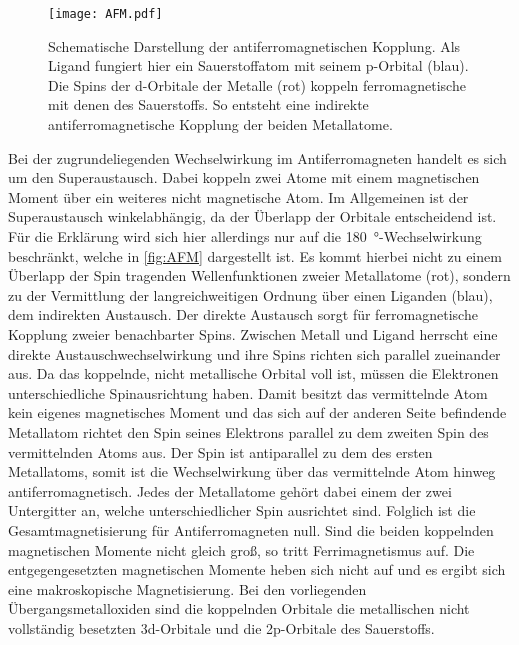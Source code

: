         \begin{figure}
            \centering
            \texttt{[image: AFM.pdf]}
            \caption{Schematische Darstellung der antiferromagnetischen Kopplung.
            Als Ligand fungiert hier ein Sauerstoffatom mit seinem p-Orbital (blau).
            Die Spins der d-Orbitale der Metalle (rot) koppeln ferromagnetische mit denen des Sauerstoffs.
            So entsteht eine indirekte antiferromagnetische Kopplung der beiden Metallatome.}
            \label{fig:AFM}
        \end{figure}
        Bei der zugrundeliegenden Wechselwirkung im Antiferromagneten handelt es sich um den Superaustausch.
        Dabei koppeln zwei Atome mit einem magnetischen Moment über ein weiteres nicht magnetische Atom. 
        Im Allgemeinen ist der Superaustausch winkelabhängig, da der Überlapp der Orbitale entscheidend ist.
        Für die Erklärung wird sich hier allerdings nur auf die \SI{180}{\degree}-Wechselwirkung beschränkt, welche in \autoref{fig:AFM} dargestellt ist.
        Es kommt hierbei nicht zu einem Überlapp der Spin tragenden Wellenfunktionen zweier Metallatome (rot), sondern zu der Vermittlung der langreichweitigen Ordnung über einen Liganden (blau), dem indirekten Austausch.
        Der direkte Austausch sorgt für ferromagnetische Kopplung zweier benachbarter Spins.
        Zwischen Metall und Ligand herrscht eine direkte Austauschwechselwirkung und ihre Spins richten sich parallel zueinander aus.
        Da das koppelnde, nicht metallische Orbital voll ist, müssen die Elektronen unterschiedliche Spinausrichtung haben.
        Damit besitzt das vermittelnde Atom kein eigenes magnetisches Moment und das sich auf der anderen Seite befindende Metallatom richtet den Spin seines Elektrons parallel zu dem zweiten Spin des vermittelnden Atoms aus.
        Der Spin ist antiparallel zu dem des ersten Metallatoms, somit ist die Wechselwirkung über das vermittelnde Atom hinweg antiferromagnetisch. 
        Jedes der Metallatome gehört dabei einem der zwei Untergitter an, welche unterschiedlicher Spin ausrichtet sind.
        Folglich ist die Gesamtmagnetisierung für Antiferromagneten null.
        Sind die beiden koppelnden magnetischen Momente nicht gleich groß, so tritt Ferrimagnetismus auf.
        Die entgegengesetzten magnetischen Momente heben sich nicht auf und es ergibt sich eine makroskopische Magnetisierung.
        Bei den vorliegenden Übergangsmetalloxiden sind die koppelnden Orbitale die metallischen nicht vollständig besetzten 3d-Orbitale und die 2p-Orbitale des Sauerstoffs.
        
